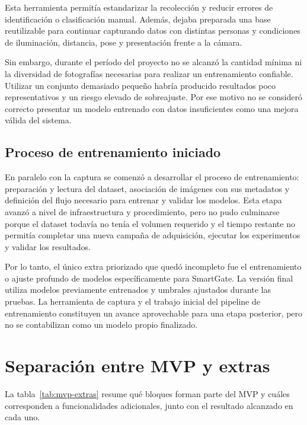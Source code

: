 Esta herramienta permitía estandarizar la recolección y reducir errores de identificación o clasificación manual. Además, dejaba preparada una base reutilizable para continuar capturando datos con distintas personas y condiciones de iluminación, distancia, pose y presentación frente a la cámara.

Sin embargo, durante el período del proyecto no se alcanzó la cantidad mínima ni la diversidad de fotografías necesarias para realizar un entrenamiento confiable. Utilizar un conjunto demasiado pequeño habría producido resultados poco representativos y un riesgo elevado de sobreajuste. Por ese motivo no se consideró correcto presentar un modelo entrenado con datos insuficientes como una mejora válida del sistema.

\subsection{Proceso de entrenamiento iniciado}

En paralelo con la captura se comenzó a desarrollar el proceso de entrenamiento: preparación y lectura del dataset, asociación de imágenes con sus metadatos y definición del flujo necesario para entrenar y validar los modelos. Esta etapa avanzó a nivel de infraestructura y procedimiento, pero no pudo culminarse porque el dataset todavía no tenía el volumen requerido y el tiempo restante no permitía completar una nueva campaña de adquisición, ejecutar los experimentos y validar los resultados.

Por lo tanto, el único extra priorizado que quedó incompleto fue el entrenamiento o ajuste profundo de modelos específicamente para SmartGate. La versión final utiliza modelos previamente entrenados y umbrales ajustados durante las pruebas. La herramienta de captura y el trabajo inicial del pipeline de entrenamiento constituyen un avance aprovechable para una etapa posterior, pero no se contabilizan como un modelo propio finalizado.

\section{Separación entre MVP y extras}

La tabla~\ref{tab:mvp-extras} resume qué bloques forman parte del MVP y cuáles corresponden a funcionalidades adicionales, junto con el resultado alcanzado en cada uno.

